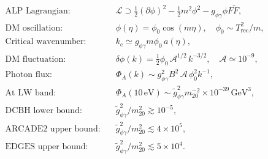 \documentclass[12pt,a4paper]{report}
\newcommand{\Trec}{T_{\mathrm{rec}}}
\newcommand{\kc}{k_{\mathrm{c}}}
\newcommand{\gag}{g_{\phi\gamma}}
\newcommand{\gtag}{\tilde{g}_{\phi\gamma}}
\newcommand{\phizero}{\phi_0}
\theoremstyle{definition}
\begin{document}
\begin{align}
  \text{ALP Lagrangian:}\quad &
  \mathcal{L} \supset \frac{1}{2}(\partial\phi)^2 - \frac{1}{2}m^2\phi^2 - \gag\phi F\tilde F,\\
  \text{DM oscillation:}\quad &
  \phi(\eta) = \phizero\cos(m\eta),\quad \phizero\sim\Trec^2/m, \\
  \text{Critical wavenumber:}\quad &
  \kc\simeq \gag m\phizero\,a(\eta),\\
  \text{DM fluctuation:}\quad &
  \delta\phi(k) = \tfrac{1}{2}\phizero\,\mathcal{A}^{1/2}\,k^{-3/2},\quad
  \mathcal{A}\simeq10^{-9},\\
  \text{Photon flux:}\quad &
  \Phi_A(k)\sim \gag^2 B^2\,\mathcal{A}\,\phizero^2 k^{-1},\\
  \text{At LW band:}\quad &
  \Phi_A(10\,\mathrm{eV})\sim\gtag^2 m_{20}^{-2}\times10^{-39}\,\mathrm{GeV}^3,\\
  \text{DCBH lower bound:}\quad &
  \gtag^2/m_{20}^2 \gtrsim 10^{-5},\\
  \text{ARCADE2 upper bound:}\quad &
  \gtag^2/m_{20}^2 \lesssim 4\times10^5,\\
  \text{EDGES upper bound:}\quad &
  \gtag^2/m_{20}^2 \lesssim 5\times10^4.
\end{align}
\end{document}
